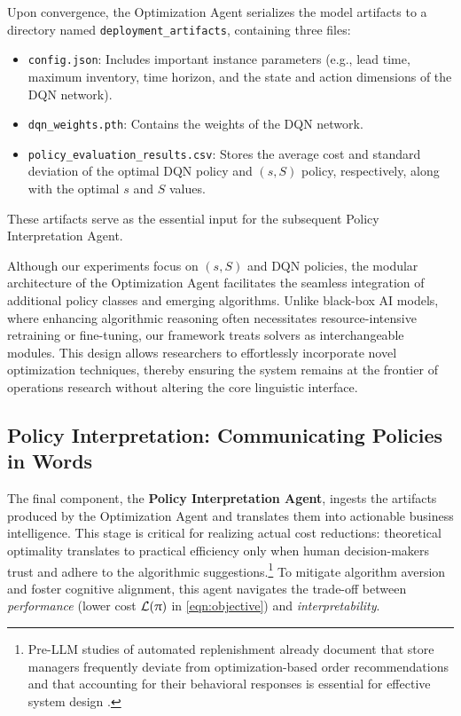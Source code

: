     
        Upon convergence, the Optimization Agent serializes the model artifacts to a directory named \texttt{deployment\_artifacts}, containing three files:
    
    \begin{itemize}
        \item \texttt{config.json}: Includes important instance parameters (e.g., lead time, maximum inventory, time horizon, and the state and action dimensions of the DQN network).
        \item \texttt{dqn\_weights.pth}: Contains the weights of the DQN network.
        \item \texttt{policy\_evaluation\_results.csv}: Stores the average cost and standard deviation of the optimal DQN policy and $(s, S)$ policy, respectively, along with the optimal $s$ and $S$ values.
    \end{itemize}
    These artifacts serve as the essential input for the subsequent Policy Interpretation Agent.

\begin{remark}
    Although our experiments focus on $(s,S)$ and DQN policies, the modular architecture of the Optimization Agent facilitates the seamless integration of additional policy classes and emerging algorithms. Unlike black-box AI models, where enhancing algorithmic reasoning often necessitates resource-intensive retraining or fine-tuning, our framework treats solvers as interchangeable modules. This design allows researchers to effortlessly incorporate novel optimization techniques, thereby ensuring the system remains at the frontier of operations research without altering the core linguistic interface.
\end{remark}

    
    
    \subsection{Policy Interpretation: Communicating Policies in Words}
    The final component, the \textbf{Policy Interpretation Agent}, ingests the artifacts produced by the Optimization Agent and translates them into actionable business intelligence. This stage is critical for realizing actual cost reductions: theoretical optimality translates to practical efficiency only when human decision-makers trust and adhere to the algorithmic suggestions.\footnote{Pre-LLM studies of automated replenishment already document that store managers frequently deviate from optimization-based order recommendations and that accounting for their behavioral responses is essential for effective system design \citep{van2010ordering}.} 
    To mitigate algorithm aversion and foster cognitive alignment, this agent navigates the trade-off between \emph{performance} (lower cost $\mathcal{L}(\uppi)$ in \cref{eqn:objective}) and \emph{interpretability}.

